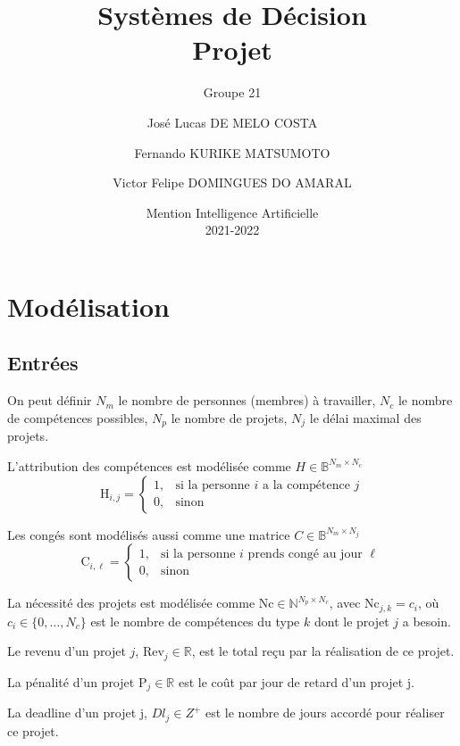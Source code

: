\documentclass[12pt, a4paper, english, version=last, parskip=half, titlepage]{scrartcl}
\title{Systèmes de Décision \texorpdfstring{\\}{---} Projet}
\subtitle{Groupe 21}
\author{José Lucas DE MELO COSTA \and
Fernando KURIKE MATSUMOTO \and
Victor Felipe DOMINGUES DO AMARAL}
\date{Mention Intelligence Artificielle \\2021-2022}
\begin{document}
\maketitle
\tableofcontents

\section{Modélisation}

\subsection{Entrées}

On peut définir $N_m$ le nombre de personnes (membres) à travailler, $N_c$ le nombre de compétences possibles, $N_p$ le nombre de projets, $N_j$ le délai maximal des projets.

L'attribution des compétences est modélisée comme $H \in \mathbb{B}^{N_m\times N_c}$
\begin{equation*}
    \text{H}_{i,j} = 
    \begin{cases}
        1, & \text{si la personne $i$ a la compétence $j$} \\
        0, & \text{sinon}
    \end{cases}
\end{equation*}

Les congés sont modélisés aussi comme une matrice $C \in \mathbb{B}^{N_m \times N_j}$
\begin{equation*}
    \text{C}_{i,\ell} = 
    \begin{cases}
        1, & \text{si la personne $i$ prends congé au jour $\ell$} \\
        0, & \text{sinon}
    \end{cases}
\end{equation*}

La nécessité des projets est modélisée comme $\text{Nc} \in \mathbb{N}^{N_p \times N_c}$, avec $\text{Nc}_{j,k} =  c_i$, où $c_i \in \{0, \dots, N_c\}$ est le nombre de compétences du type $k$ dont le projet $j$ a besoin.

Le revenu d'un projet $j$, $\text{Rev}_j \in \mathbb{R}$, est le total reçu par la réalisation de ce projet.

La pénalité d'un projet $\text{P}_j \in \mathbb{R}$ est le coût par jour de retard d'un projet j.

La deadline d'un projet j, $Dl_j \in Z^{+}$ est le nombre de jours accordé pour réaliser ce projet.
\end{document}
